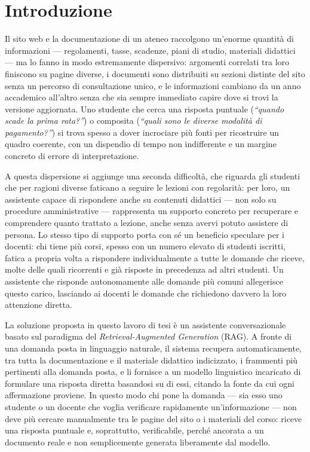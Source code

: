 \chapter{Introduzione}
\label{cap:introduzione}

Il sito web e la documentazione di un ateneo raccolgono un'enorme quantità di informazioni --- regolamenti, tasse,
scadenze, piani di studio, materiali didattici --- ma lo fanno in modo estremamente dispersivo: argomenti correlati
tra loro finiscono su pagine diverse, i documenti sono distribuiti su sezioni distinte del sito senza un percorso di
consultazione unico, e le informazioni cambiano da un anno accademico all'altro senza che sia sempre immediato
capire dove si trovi la versione aggiornata. Uno studente che cerca una risposta puntuale (\emph{``quando scade la
prima rata?''}) o composita (\emph{``quali sono le diverse modalità di pagamento?''}) si trova spesso a dover
incrociare più fonti per ricostruire un quadro coerente, con un dispendio di tempo non indifferente e un margine
concreto di errore di interpretazione.

A questa dispersione si aggiunge una seconda difficoltà, che riguarda gli studenti che per ragioni diverse faticano a
seguire le lezioni con regolarità: per loro, un assistente capace di rispondere anche su contenuti didattici --- non
solo su procedure amministrative --- rappresenta un supporto concreto per recuperare e comprendere quanto trattato a
lezione, anche senza avervi potuto assistere di persona. Lo stesso tipo di supporto porta con sé un beneficio
speculare per i docenti: chi tiene più corsi, spesso con un numero elevato di studenti iscritti, fatica a propria
volta a rispondere individualmente a tutte le domande che riceve, molte delle quali ricorrenti e già risposte in
precedenza ad altri studenti. Un assistente che risponde autonomamente alle domande più comuni allegerisce questo
carico, lasciando ai docenti le domande che richiedono davvero la loro attenzione diretta.

La soluzione proposta in questo lavoro di tesi è un assistente conversazionale basato sul paradigma del
\emph{Retrieval-Augmented Generation} (RAG). A fronte di una domanda posta in linguaggio naturale, il sistema
recupera automaticamente, tra tutta la documentazione e il materiale didattico indicizzato, i frammenti più
pertinenti alla domanda posta, e li fornisce a un modello linguistico incaricato di formulare una risposta diretta
basandosi su di essi, citando la fonte da cui ogni affermazione proviene. In questo modo chi pone la domanda --- sia
esso uno studente o un docente che voglia verificare rapidamente un'informazione --- non deve più cercare manualmente
tra le pagine del sito o i materiali del corso: riceve una risposta puntuale e, soprattutto, verificabile, perché
ancorata a un documento reale e non semplicemente generata liberamente dal modello.

